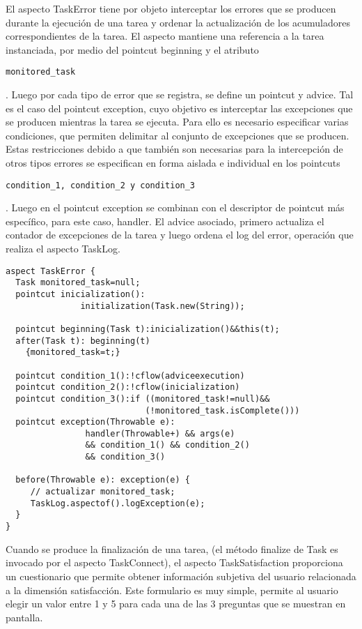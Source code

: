 El aspecto TaskError tiene por objeto interceptar los errores que se producen durante la ejecución de una tarea y ordenar la actualización de los acumuladores correspondientes de la tarea. El aspecto mantiene una referencia a la tarea instanciada, por medio del pointcut beginning y el atributo \begin{verbatim}
monitored_task
\end{verbatim}. Luego por cada tipo de error que se registra, se define un pointcut y advice. Tal es el caso del pointcut exception, cuyo objetivo es interceptar las excepciones que se producen mientras la tarea se ejecuta. Para ello es necesario especificar varias condiciones, que permiten delimitar al conjunto de excepciones que se producen. Estas restricciones debido a que también son necesarias para la intercepción de otros tipos errores se especifican en forma aislada e individual en los pointcuts  \begin{verbatim}
condition_1, condition_2 y condition_3
\end{verbatim}. Luego en el pointcut exception se combinan con el descriptor de pointcut más específico, para este caso, handler. El advice asociado, primero actualiza el contador de excepciones de la tarea y luego ordena el log del error, operación que realiza el aspecto TaskLog. 

\begin{verbatim}
aspect TaskError {
  Task monitored_task=null;
  pointcut inicialization():    
               initialization(Task.new(String));

  pointcut beginning(Task t):inicialization()&&this(t);
  after(Task t): beginning(t)
    {monitored_task=t;} 

  pointcut condition_1():!cflow(adviceexecution)
  pointcut condition_2():!cflow(inicialization) 
  pointcut condition_3():if ((monitored_task!=null)&&
                            (!monitored_task.isComplete()))
  pointcut exception(Throwable e): 
                handler(Throwable+) && args(e)
                && condition_1() && condition_2()
                && condition_3()

  before(Throwable e): exception(e) {
     // actualizar monitored_task;
     TaskLog.aspectof().logException(e);
  }
}

\end{verbatim}

Cuando se produce la finalización de una tarea, (el método finalize de Task es invocado por el aspecto TaskConnect), el aspecto TaskSatisfaction proporciona un cuestionario que permite obtener información subjetiva del usuario relacionada a la dimensión satisfacción. Este formulario es muy simple, permite al usuario elegir un valor entre 1 y 5 para cada una de las 3 preguntas que se muestran en pantalla. 

